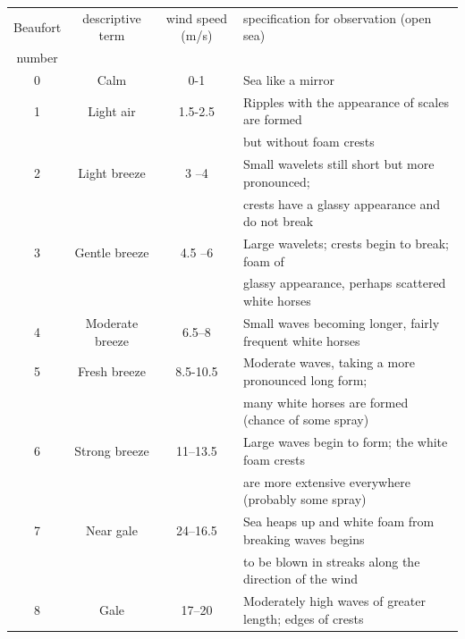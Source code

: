 \begin{table}
  \centering
  \begin{tabular}{|c|c|c|l|}
\hline
 Beaufort & descriptive term & wind speed  (m/s) & specification for observation (open sea)  \\
 number &   &   &   \\
\hline
0               & Calm             &  0-1               & Sea like a mirror          \\
1               & Light air        &  1.5-2.5           & Ripples with the appearance of scales are formed \\
                &                  &                    & but without foam crests \\
2		& Light breeze     & 3 --4 		& Small wavelets still short but more pronounced; \\
                &                  &                    & crests have a glassy appearance and do not break \\
3               & Gentle breeze    & 4.5 --6            &  Large wavelets; crests begin to break;  foam of  \\
                &                  &                    & glassy appearance, perhaps scattered white horses \\
4		& Moderate breeze  & 6.5--8             &  Small waves becoming longer, fairly frequent white horses \\
5               & Fresh breeze     & 8.5-10.5           & Moderate waves, taking a more pronounced long form; \\
                &                  &                    & many white horses are formed (chance of some spray) \\
6               & Strong breeze    & 11--13.5           & Large waves begin to form; the white foam crests \\
                &                  &                    & are more extensive everywhere  (probably some spray)\\
7               &    Near gale     & 24--16.5           & Sea heaps up and white foam from breaking waves begins \\
                &                  &                    & to be blown in streaks along the direction of the wind \\
8               & Gale             & 17--20             & Moderately high waves of greater length; edges of crests \\

\end{tabular}
\end{table}
